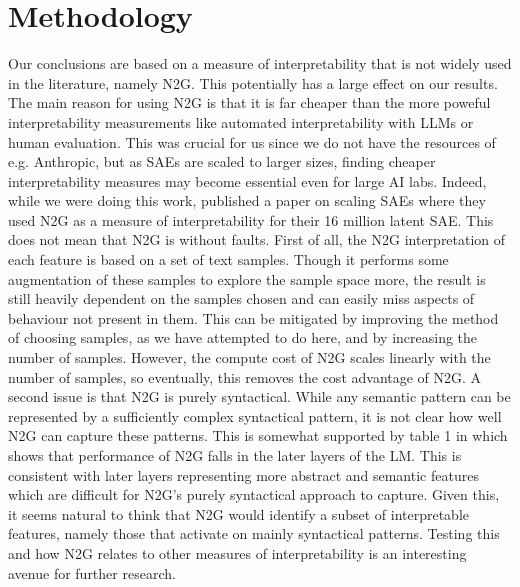 \section{Methodology}
\label{sec:n2g_interpretability}
Our conclusions are based on a measure of interpretability that is not widely used in the literature, namely \ac{N2G}.
This potentially has a large effect on our results.
The main reason for using \ac{N2G} is that it is far cheaper than the more poweful interpretability measurements like automated interpretability with \ac{LLM}s or human evaluation.
This was crucial for us since we do not have the resources of e.g. Anthropic, but as \acp{SAE} are scaled to larger sizes, finding cheaper interpretability measures may become essential even for large AI labs.
Indeed, while we were doing this work, \textcite{gao_scaling_2024} published a paper on scaling \acp{SAE} where they used \ac{N2G} as a measure of interpretability for their 16 million latent SAE.
This does not mean that \ac{N2G} is without faults.
First of all, the \ac{N2G} interpretation of each feature is based on a set of text samples.
Though it performs some augmentation of these samples to explore the sample space more, the result is still heavily dependent on the samples chosen and can easily miss aspects of behaviour not present in them.
This can be mitigated by improving the method of choosing samples, as we have attempted to do here, and by increasing the number of samples.
However, the compute cost of \ac{N2G} scales linearly with the number of samples, so eventually, this removes the cost advantage of \ac{N2G}.
A second issue is that \ac{N2G} is purely syntactical.
While any semantic pattern can be represented by a sufficiently complex syntactical pattern, it is not clear how well \ac{N2G} can capture these patterns.
This is somewhat supported by table 1 in \textcite{foote_neuron_2023} which shows that performance of \ac{N2G} falls in the later layers of the \ac{LM}.
This is consistent with later layers representing more abstract and semantic features which are difficult for \ac{N2G}'s purely syntactical approach to capture.
Given this, it seems natural to think that \ac{N2G} would identify a subset of interpretable features, namely those that activate on mainly syntactical patterns.
Testing this and how \ac{N2G} relates to other measures of interpretability is an interesting avenue for further research.

